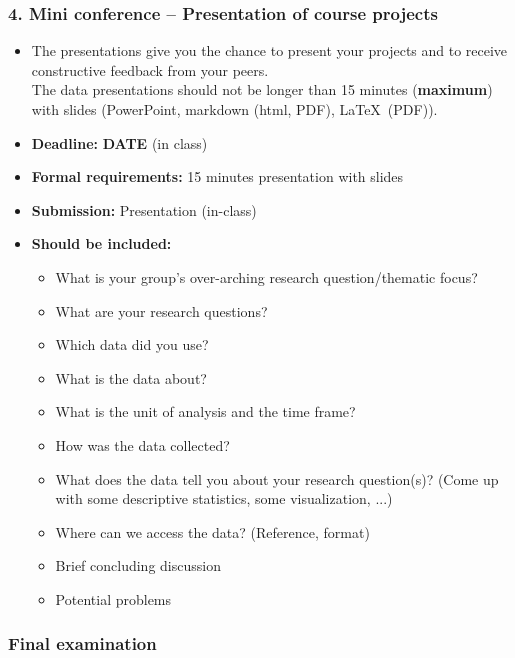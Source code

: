 \documentclass{article}
\begin{document}
\subsubsection*{4. Mini conference -- Presentation of course projects}
\begin{itemize}
\item[] \noindent The presentations give you the chance to present your projects and to receive constructive feedback from your peers.\\
The data presentations should not be longer than 15 minutes (\textbf{maximum}) with slides (PowerPoint, markdown (html, PDF), \LaTeX~(PDF)).
\item[] \textbf{Deadline:} \textbf{DATE} (in class)
\item[] \textbf{Formal requirements:} 15 minutes presentation with slides
\item[] \textbf{Submission:} Presentation (in-class)
\item[] \textbf{Should be included:}
\begin{itemize}
\item[-] What is your group's over-arching research question/thematic focus? 
\item[-] What are your research questions?
\item[-] Which data did you use?
\item[-] What is the data about?
\item[-] What is the unit of analysis and the time frame?
\item[-] How was the data collected?
\item[-] What does the data tell you about your research question(s)? (Come up with some descriptive statistics, some visualization, ...)
\item[-] Where can we access the data? (Reference, format) 
\item[-] Brief concluding discussion
\item[-] Potential problems
\end{itemize}
\end{itemize}

\newpage
\subsubsection*{Final examination}
\end{document}
